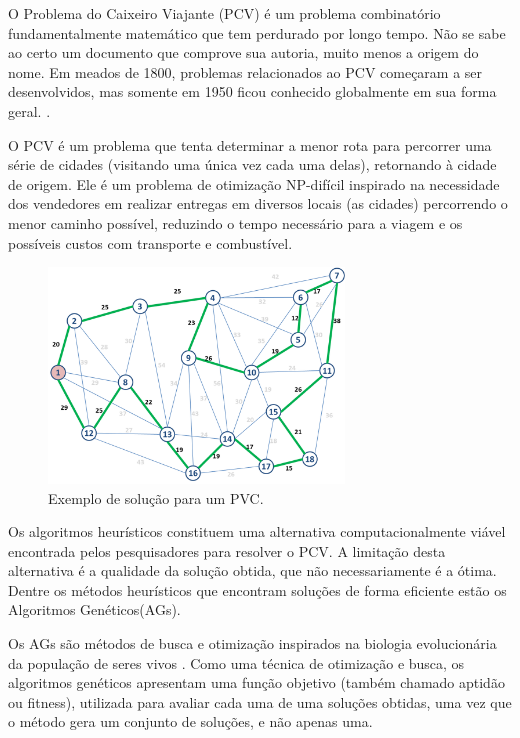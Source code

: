 \documentclass[
article,			%
11pt,				%
oneside,			%
a4paper,			%
english,			%
brazil,				%
sumario=tradicional
]{article}
\begin{document}
	O Problema do Caixeiro Viajante (PCV) é um problema combinatório fundamentalmente matemático que tem perdurado por longo tempo. Não se sabe ao certo um documento que comprove sua autoria, muito menos a origem do nome. Em meados de 1800, problemas relacionados ao PCV começaram a ser desenvolvidos, mas somente em 1950 ficou conhecido globalmente em sua forma geral. \cite{APPLEGATE}.

	O PCV é um problema que tenta determinar a menor rota para percorrer uma série de cidades (visitando uma única vez cada uma delas), retornando à cidade de origem. Ele é um problema de otimização NP-difícil inspirado na necessidade dos vendedores em realizar entregas em diversos locais (as cidades) percorrendo o menor caminho possível, reduzindo o tempo necessário para a viagem e os possíveis custos com transporte e combustível.

	\begin{figure}[H]
		\centering
		\includegraphics[width=0.7\textwidth]{Figuras/grafo-caixeiro-viajante.png}
		\caption{Exemplo de solução para um PVC.}
	\end{figure}

	Os algoritmos heurísticos constituem uma alternativa computacionalmente viável encontrada pelos pesquisadores para resolver o PCV. A limitação desta alternativa é a qualidade da solução obtida, que não necessariamente é a ótima. Dentre os métodos heurísticos que encontram soluções de forma eficiente estão os Algoritmos Genéticos(AGs).
	
	Os AGs são métodos de busca e otimização inspirados na biologia evolucionária da população de seres vivos \cite{DARWIN}\cite{HOLLAND} \cite{GOLDBERG}. Como uma técnica de otimização e busca, os algoritmos genéticos apresentam uma função objetivo (também chamado aptidão ou fitness), utilizada para avaliar cada uma de uma soluções obtidas, uma vez que o método gera um conjunto de soluções, e não apenas uma.
	
\end{document}
